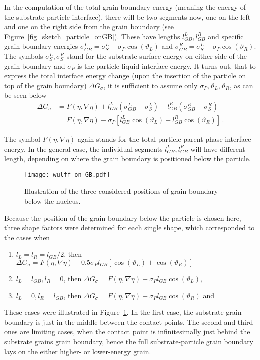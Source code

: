 In the computation of the total grain boundary energy (meaning the energy of the substrate-particle interface), there will be two segments now, one on the left and one on the right side from the grain boundary (see Figure~\ref{fig_sketch_particle_onGB}). These have lengths $l_{GB}^{L}, l_{GB}^{R}$ and specific grain boundary energies $\sigma_{GB}^L=\sigma_{S}^L-\sigma_P\cos(\vartheta_L)$ and $\sigma_{GB}^R=\sigma_{S}^L-\sigma_P\cos(\vartheta_R)$. The symbols $\sigma_{S}^L,\sigma_{S}^R$ stand for the substrate surface energy on either side of the grain boundary and $\sigma_{P}$ is the particle-liquid interface energy. It turns out, that to express the total interface energy change (upon the insertion of the particle on top of the grain boundary) $\Delta G_\sigma$, it is sufficient to assume only $\sigma_P,\vartheta_L,\vartheta_R$, as can be seen below
\begin{align}
	\Delta G_\sigma &= F(\eta,\nabla\eta) + l_{GB}^{L}(\sigma_{GB}^L-\sigma_{S}^L) + l_{GB}^{R}(\sigma_{GB}^R-\sigma_{S}^R) \\
	&= F(\eta,\nabla\eta) - \sigma_P[l_{GB}^{L}\cos(\vartheta_L) + l_{GB}^{R}\cos(\vartheta_R)] \,.
\end{align}

The symbol $F(\eta,\nabla\eta)$ again stands for the total particle-parent phase interface energy. In the general case, the individual segments $l_{GB}^{L}, l_{GB}^{R}$ will have different length, depending on where the grain boundary is positioned below the particle. 

\begin{figure}
	\centering
	\texttt{[image: wulff\_on\_GB.pdf]}
	\caption{Illustration of the three considered positions of grain boundary below the nucleus.}
	\label{fig_GB_below_wulff}
\end{figure}

Because the position of the grain boundary below the particle is chosen here, three shape factors were determined for each single shape, which corresponded to the cases when 
\begin{enumerate}
	\item $l_L = l_R = l_{GB}/2$, then $\Delta G_\sigma = F(\eta,\nabla\eta)- 0.5\sigma_Pl_{GB}[\cos(\vartheta_L)+\cos(\vartheta_R)]$
	\item $l_L = l_{GB}, l_R = 0$, then $\Delta G_\sigma = F(\eta,\nabla\eta)- \sigma_Pl_{GB}\cos(\vartheta_L)$,
	\item $l_L = 0, l_R = l_{GB}$, then $\Delta G_\sigma = F(\eta,\nabla\eta)- \sigma_Pl_{GB}\cos(\vartheta_R)$ and
\end{enumerate}
These cases were illustrated in Figure~\ref{fig_GB_below_wulff}. In the first case, the substrate grain boundary is just in the middle between the contact points. The second and third ones are limiting cases, when the contact point is infinitesimally just behind the substrate grains grain boundary, hence the full substrate-particle grain boundary lays on the either higher- or lower-energy grain. 

